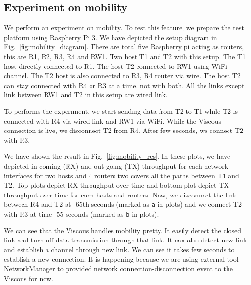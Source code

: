\subsection{Experiment on mobility}
We perform an experiment on mobility. To test this feature, we prepare the test platform using Raspberry Pi 3. We have depicted the setup diagram in Fig.~\ref{fig:mobility_diagram}. There are total five Raspberry pi acting as routers, this are R1, R2, R3, R4 and RW1. Two host T1 and T2 with this setup. The T1 host directly connected to R1. The host T2 connected to RW1 using WiFi channel. The T2 host is also connected to R3, R4 router via wire. The host T2 can stay connected with R4 or R3 at a time, not with both. All the links except link between RW1 and T2 in this setup are wired link.

To performs the experiment, we start sending data from T2 to T1 while T2 is connected with R4 via wired link and RW1 via WiFi. While the Viscous connection is live, we disconnect T2 from R4. After few seconds, we connect T2 with R3. 

We have shown the result in Fig.~\ref{fig:mobility_res}. In these plots, we have depicted in-coming (RX) and out-going (TX) throughput for each network interfaces for two hosts and 4 routers two covers all the paths between T1 and T2. Top plots depict RX throughput over time and bottom plot depict TX throughput over time for each hosts and routers. Now, we disconnect the link between R4 and T2 at -65th seconds (marked as {\tt a} in plots) and we connect T2 with R3 at time -55 seconds (marked as {\tt b} in plots).

We can see that the Viscous handles mobility pretty. It easily detect the closed link and turn off data transmission through that link. It can also detect new link and establish a channel through new link. We can see it takes few seconds to establish a new connection. It is happening because we are using external tool NetworkManager to provided network connection-disconnection event to the Viscous for now.
